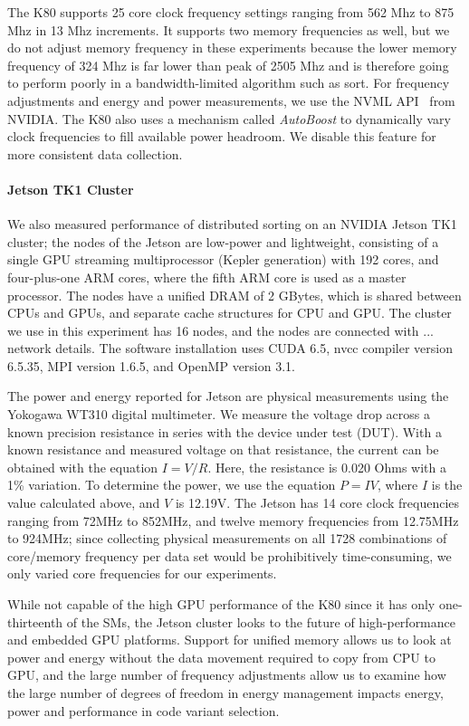 The K80 supports 25 core clock frequency settings ranging from 562 Mhz to 875 Mhz
in 13 Mhz increments.
It supports two memory frequencies as well, 
but we do not adjust memory frequency in these experiments 
because the lower memory frequency of 324 Mhz
is far lower than peak of 2505 Mhz
and is therefore going to perform poorly in a bandwidth-limited
algorithm such as sort.
For frequency adjustments and energy and power measurements, we use the NVML
API~\cite{} from NVIDIA. The K80 also uses a mechanism called \textit{AutoBoost} to dynamically
vary clock frequencies to fill available power headroom. We disable this feature
for more consistent data collection.

\paragraph{Jetson TK1 Cluster}
We also measured performance of distributed sorting on an NVIDIA 
Jetson TK1 cluster; the nodes of the Jetson are low-power and lightweight,
consisting of a single GPU streaming multiprocessor (Kepler generation)
with 192 cores, and 
four-plus-one ARM cores, where the fifth ARM core is used as a master processor.
The nodes have a unified DRAM of 2 GBytes, which is shared between CPUs and
GPUs, and separate cache structures for CPU and GPU.
The cluster we use in this experiment has 16 nodes, and
the nodes are connected with {\color{red} ... network details.}
The software installation uses CUDA 6.5, nvcc compiler version 6.5.35,
MPI version 1.6.5, and OpenMP version 3.1.

The power and energy reported for
Jetson are physical measurements  
using the Yokogawa WT310 digital multimeter.
We measure the voltage drop across a known precision resistance in series with the device under test (DUT).
With a known resistance and measured voltage on that resistance,
the current can be obtained with the equation $I=V/R$.
Here, the resistance is 0.020 Ohms with a 1\% variation.
To determine the power, we use the equation $P=IV$, where $I$ is the value calculated above, and $V$ is 12.19V.
The Jetson has 14 core clock frequencies ranging from 72MHz to 852MHz,
and twelve memory frequencies from 12.75MHz to 924MHz;
since collecting physical measurements 
on all 1728 combinations of core/memory frequency per data set would 
be prohibitively time-consuming, we only varied core frequencies for our experiments.

While not capable of the high GPU performance of the K80
since it has only one-thirteenth of the SMs,
the Jetson cluster looks to the future of high-performance and 
embedded GPU platforms. Support for unified memory allows us to look 
at power and energy without the data movement required to copy
from CPU to GPU, and the large number of frequency adjustments
allow us to examine how the large number of degrees of freedom
in energy management impacts energy, power and performance in 
code variant selection. 
